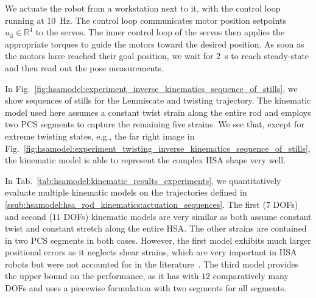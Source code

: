 We actuate the robot from a workstation next to it, with the control loop running at \SI{10}{Hz}. The control loop communicates motor position setpoints $u_\mathrm{d} \in \mathbb{R}^4$ to the servos. The inner control loop of the servos then applies the appropriate torques to guide the motors toward the desired position. As soon as the motors have reached their goal position, we wait for \SI{2}{s} to reach steady-state and then read out the pose measurements.

In Fig.~\ref{fig:hsamodel:experiment_inverse_kinematics_sequence_of_stills}, we show sequences of stills for the Lemniscate and twisting trajectory. The kinematic model used here assumes a constant twist strain along the entire rod and employs two \gls{PCS} segments to capture the remaining five strains. We see that, except for extreme twisting states, e.g., the far right image in Fig.~\ref{fig:hsamodel:experiment_twisting_inverse_kinematics_sequence_of_stills}, the kinematic model is able to represent the complex \gls{HSA} shape very well.

In Tab.~\ref{tab:hsamodel:kinematic_results_experiments}, we quantitatively evaluate multiple kinematic models on the trajectories defined in \ref{ssub:hsamodel:hsa_rod_kinematics:actuation_sequences}. 
The first ($7$ \glspl{DOF}) and second ($11$ \glspl{DOF}) kinematic models are very similar as both assume constant twist and constant stretch along the entire \gls{HSA}. The other strains are contained in two \gls{PCS} segments in both cases. However, the first model exhibits much larger positional errors as it neglects shear strains, which are very important in \gls{HSA} robots but were not accounted for in the literature~\citep{garg2022kinematic}.
The third model provides the upper bound on the performance, as it has with $12$ comparatively many \glspl{DOF} and uses a piecewise formulation with two segments for all segments. 
